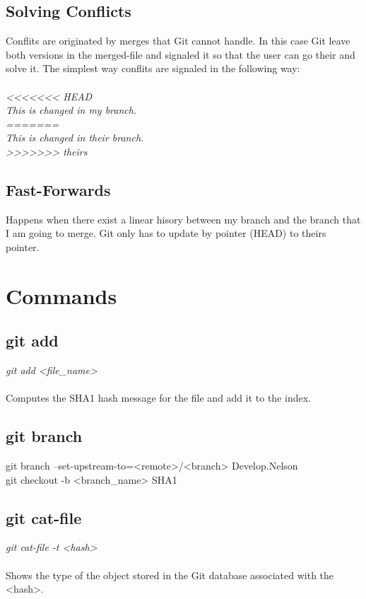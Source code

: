 \subsection{Solving Conflicts}

Conflits are originated by merges that Git cannot handle.
In this case Git leave both versions in the merged-file and signaled it so that the user can go their and solve it.
The simplest way conflits are signaled in the following way:\\
\\
\emph{
<<<<<<< HEAD\\
This is changed in my branch.\\
=======\\
This is changed in their branch.\\
>>>>>>> theirs\\
}

\subsection{Fast-Forwards}

Happens when there exist a linear hisory between my branch and the branch that I am going to merge.
Git only has to update by pointer (HEAD) to theirs pointer.

\section{Commands}

\subsection{git add}

\emph{git add <file\_name>}\\
\\
Computes the SHA1 hash message for the file and add it to the index.

\subsection{git branch}
git branch --set-upstream-to=<remote>/<branch> Develop.Nelson\\
git checkout -b <branch\_name> SHA1

\subsection{git cat-file}

\hspace{\parindent}\emph{git cat-file -t <hash>}\\
\\
Shows the type of the object stored in the Git database associated with the <hash>.\\

